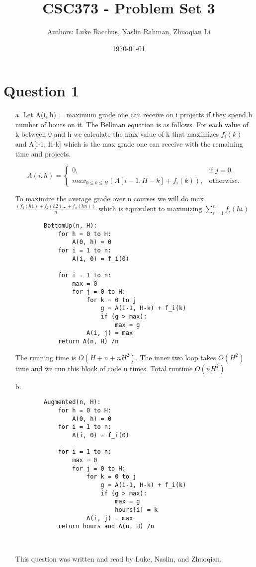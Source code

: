 \documentclass[12pt]{article}
\title{\textbf{CSC373 - Problem Set 3}}
\author{Authors: Luke Bacchus, Naslin Rahman, Zhuoqian Li}
\date{\today}
\begin{document}
\maketitle
\section*{Question 1}
\begin{enumerate}
    \item[a.] Let A(i, h) = maximum grade one can receive on i projects if they spend h number of 
    hours on it. The Bellman equation is as follows. For each value of k between 0 and h we calculate 
    the max value of k that maximizes $f_i(k)$ and A[i-1, H-k] which is the max grade one can receive 
    with the remaining time and projects.
    
        \begin{equation}
            A(i,h)=\begin{cases}
         0, & \text{if $j=0$}.\\
        max_{0 \leq k \leq H}(A[i-1,H-k] + f_i(k)), & \text{otherwise}.
        \end{cases}
        \end{equation}
  
    To maximize the average grade over n courses we will do max $\frac{(f_1(h1) + f_2(h2) ... + f_n(hn))}{n}$ which is equivalent to maximizing $\sum_{i = 1}^ {n} f_i(hi)$
  
    \begin{verbatim}
        BottomUp(n, H):
            for h = 0 to H:
                A(0, h) = 0
            for i = 1 to n:
                A(i, 0) = f_i(0)
            
            for i = 1 to n:
                max = 0
                for j = 0 to H:
                    for k = 0 to j
                        g = A(i-1, H-k) + f_i(k)
                        if (g > max):
                            max = g
                    A(i, j) = max
            return A(n, H) /n
    \end{verbatim}
    The running time is $O(H + n +nH^2)$. The inner two loop takes $O(H^2)$ time and we run this 
    block of code n times. Total runtime $O(nH^2)$
    \item[b.] \begin{verbatim}
        Augmented(n, H):
            for h = 0 to H:
                A(0, h) = 0
            for i = 1 to n:
                A(i, 0) = f_i(0)
            
            for i = 1 to n:
                max = 0
                for j = 0 to H:
                    for k = 0 to j
                        g = A(i-1, H-k) + f_i(k)
                        if (g > max):
                            max = g
                            hours[i] = k
                    A(i, j) = max
            return hours and A(n, H) /n
                    
        
    \end{verbatim}
    This question was written and read by  Luke, Naslin, and Zhuoqian.
\end{enumerate}
    
\end{document}

